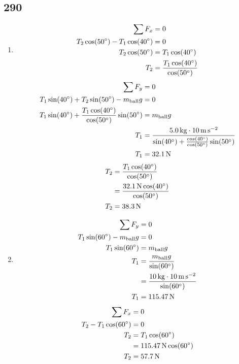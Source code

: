 \documentclass{article}
\begin{document}
\subsection{290}
\begin{enumerate}[label=\textbf{(\alph*)}]
	\item
		\begin{align*}
			\sum F_x & = 0 \\
			T_2\cos(50\degree) - T_1\cos(40\degree) & = 0 \\
			T_2\cos(50\degree) & = T_1\cos(40\degree) \\
			T_2 & = \frac{T_1\cos(40\degree)}{\cos(50\degree)} \\
		\end{align*}
		\begin{align*}
			\sum F_y & = 0 \\
			T_1\sin(40\degree) + T_2\sin(50\degree) - m_\text{ball}g & = 0 \\
			T_1\sin(40\degree) + \frac{T_1\cos(40\degree)}{\cos(50\degree)}\sin(50\degree) & = m_\text{ball}g \\
			T_1 & = \frac{\SI{5.0}{\kilogram} \cdot \SI{10}{\meter \per \second \squared}}{\sin(40\degree) + \frac{cos(40\degree)}{\cos(50\degree)}\sin(50\degree)} \\
			T_1 & = \SI{32.1}{\newton}
		\end{align*}
		\begin{align*}
			T_2 & = \frac{T_1\cos(40\degree)}{\cos(50\degree)} \\
				& = \frac{\SI{32.1}{\newton}\cos(40\degree)}{\cos(50\degree)} \\
			T_2 & = \SI{38.3}{\newton}
		\end{align*}
	\item
		\begin{align*}
			\sum F_y & = 0 \\
			T_1\sin(60\degree) - m_\text{ball}g & = 0 \\
			T_1\sin(60\degree) & = m_\text{ball}g \\
			T_1 & = \frac{m_\text{ball}g}{\sin(60\degree)} \\
				& = \frac{\SI{10}{\kilogram} \cdot \SI{10}{\meter \per \second \squared}}{\sin(60\degree)} \\
			T_1 & = \SI{115.47}{\newton}
		\end{align*}
		\begin{align*}
			\sum F_x & = 0 \\
			T_2 - T_1\cos(60\degree) & = 0 \\
			T_2 & = T_1\cos(60\degree) \\
				& = \SI{115.47}{\newton}\cos(60\degree) \\
			T_2 & = \SI{57.7}{\newton}
		\end{align*}
\end{enumerate}
\end{document}
